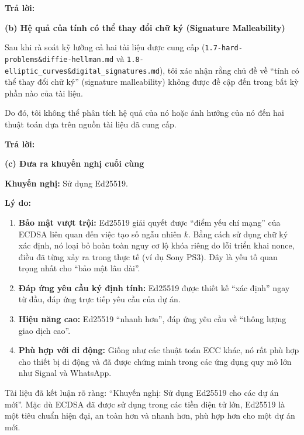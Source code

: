 \begin{center}
    \textbf{Trả lời:}
\end{center}

\textbf{(b) Hệ quả của tính có thể thay đổi chữ ký (Signature Malleability)}

Sau khi rà soát kỹ lưỡng cả hai tài liệu được cung cấp (\texttt{1.7-hard-problems\&diffie-hellman.md} và \texttt{1.8-elliptic\_curves\&digital\_signatures.md}), tôi xác nhận rằng chủ đề về ``tính có thể thay đổi chữ ký'' (signature malleability) không được đề cập đến trong bất kỳ phần nào của tài liệu.

Do đó, tôi không thể phân tích hệ quả của nó hoặc ảnh hưởng của nó đến hai thuật toán dựa trên nguồn tài liệu đã cung cấp.

\begin{center}
    \textbf{Trả lời:}
\end{center}

\textbf{(c) Đưa ra khuyến nghị cuối cùng}

\textbf{Khuyến nghị:} Sử dụng Ed25519.

\textbf{Lý do:}

\begin{enumerate}
    \item \textbf{Bảo mật vượt trội:} Ed25519 giải quyết được ``điểm yếu chí mạng'' của ECDSA liên quan đến việc tạo số ngẫu nhiên $k$. Bằng cách sử dụng chữ ký xác định, nó loại bỏ hoàn toàn nguy cơ lộ khóa riêng do lỗi triển khai nonce, điều đã từng xảy ra trong thực tế (ví dụ Sony PS3). Đây là yếu tố quan trọng nhất cho ``bảo mật lâu dài''.
    
    \item \textbf{Đáp ứng yêu cầu ký định tính:} Ed25519 được thiết kế ``xác định'' ngay từ đầu, đáp ứng trực tiếp yêu cầu của dự án.
    
    \item \textbf{Hiệu năng cao:} Ed25519 ``nhanh hơn'', đáp ứng yêu cầu về ``thông lượng giao dịch cao''.
    
    \item \textbf{Phù hợp với di động:} Giống như các thuật toán ECC khác, nó rất phù hợp cho thiết bị di động và đã được chứng minh trong các ứng dụng quy mô lớn như Signal và WhatsApp.
\end{enumerate}

Tài liệu đã kết luận rõ ràng: ``Khuyến nghị: Sử dụng Ed25519 cho các dự án mới''. Mặc dù ECDSA đã được sử dụng trong các tiền điện tử lớn, Ed25519 là một tiêu chuẩn hiện đại, an toàn hơn và nhanh hơn, phù hợp hơn cho một dự án mới.

